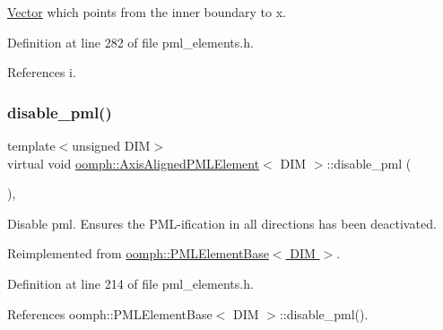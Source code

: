 \hyperlink{classoomph_1_1Vector}{Vector} which points from the inner boundary to x. 



Definition at line 282 of file pml\+\_\+elements.\+h.



References i.

\mbox{\label{classoomph_1_1AxisAlignedPMLElement_ace457b4782c083fd8b0925ae6b19a3e3}} 
\subsubsection{\texorpdfstring{disable\+\_\+pml()}{disable\_pml()}}
{\footnotesize\ttfamily template$<$unsigned D\+IM$>$ \\
virtual void \hyperlink{classoomph_1_1AxisAlignedPMLElement}{oomph\+::\+Axis\+Aligned\+P\+M\+L\+Element}$<$ D\+IM $>$\+::disable\+\_\+pml (\begin{DoxyParamCaption}{ }\end{DoxyParamCaption})\hspace{0.3cm}{\ttfamily [inline]}, {\ttfamily [virtual]}}



Disable pml. Ensures the P\+M\+L-\/ification in all directions has been deactivated. 



Reimplemented from \hyperlink{classoomph_1_1PMLElementBase_a751943790221819c111da99455275bbc}{oomph\+::\+P\+M\+L\+Element\+Base$<$ D\+I\+M $>$}.



Definition at line 214 of file pml\+\_\+elements.\+h.



References oomph\+::\+P\+M\+L\+Element\+Base$<$ D\+I\+M $>$\+::disable\+\_\+pml().

\mbox{\label{classoomph_1_1AxisAlignedPMLElement_a76a879c7122fc2e5b723fbc7ce6b602b}} 
